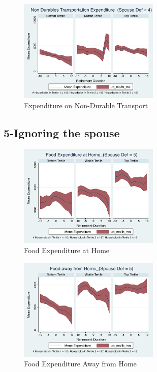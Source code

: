 \documentclass[11pt]{article}
\begin{document}
\begin{figure}[h]
	\caption{Expenditure on Non-Durable Transport}
	\centering
	\includegraphics[width=0.6\textwidth]{../ConsumptionPostRetirement_by_SpouseDef_Cats/Smoothed/4/spouse_def_total_transport_real.pdf}
\end{figure}
\clearpage

\subsection{5-Ignoring the spouse}

\begin{figure}[h]
	\caption{Food Expenditure at Home}
	\centering
	\includegraphics[width=0.6\textwidth]{../ConsumptionPostRetirement_by_SpouseDef_Cats/Smoothed/5/spouse_def_total_foodexp_home_real.pdf}
\end{figure}


\begin{figure}[h]
	\caption{Food Expenditure Away from Home}
	\centering
	\includegraphics[width=0.6\textwidth]{../ConsumptionPostRetirement_by_SpouseDef_Cats/Smoothed/5/spouse_def_total_foodexp_away_real.pdf}
\end{figure}
\end{document}
